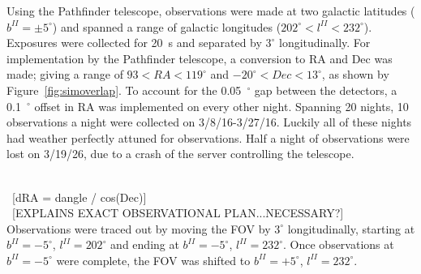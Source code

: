 \documentclass[aps,prl,twocolumn,superscriptaddress]{revtex4-1}
\begin{document}
Using the Pathfinder telescope, observations were made at two galactic latitudes ($b^{II}=\pm5^{\circ}$) and spanned a range of galactic longitudes ($202^{\circ} < l^{II} < 232^{\circ}$).  
Exposures were collected for 20~s and separated by $3^{\circ}$ longitudinally.  For implementation by the Pathfinder telescope, a conversion to RA and Dec was made; giving a range of $93 < RA < 119^{\circ}$ and $-20^{\circ} < Dec < 13^{\circ}$, as shown by Figure~\ref{fig:simoverlap}.  To account for the 0.05~$^{\circ}$ gap between the detectors, a 0.1~$^{\circ}$ offset in RA was implemented on every other night.  
Spanning 20 nights, 10 observations a night were collected on 3/8/16-3/27/16.  Luckily all of these nights had weather perfectly attuned for observations.  Half a night of observations were lost on 3/19/26, due to a crash of the server controlling the telescope.


~\\~[dRA = dangle / cos(Dec)]
~\\~[EXPLAINS EXACT OBSERVATIONAL PLAN...NECESSARY?]\\
Observations were traced out by moving the FOV by $3^{\circ}$ longitudinally, starting at $b^{II}=-5^{\circ}$, $l^{II}=202^{\circ}$ and ending at $b^{II}=-5^{\circ}$, $l^{II}=232^{\circ}$.  Once observations at $b^{II}=-5^{\circ}$ were complete, the FOV was shifted to $b^{II}=+5^{\circ}$, $l^{II}=232^{\circ}$.


\end{document}
